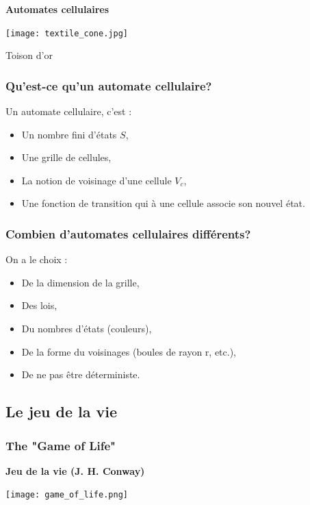 \documentclass{beamer}
\begin{document}
\begin{frame}
\begin{center}
\textbf{Automates cellulaires}
\end{center}

\begin{center}
\texttt{[image: textile\_cone.jpg]}
\end{center}

\begin{center}Toison d'or\end{center}

\end{frame}


\begin{frame}
\frametitle{Qu'est-ce qu'un automate cellulaire?}
\begin{block}{Un automate cellulaire, c'est :}
	\begin{itemize}
		\item Un nombre fini d'états $S$,
		\item Une grille de cellules,
		\item La notion de voisinage d'une cellule $V_c$,
		\item Une fonction de transition qui à une cellule associe son nouvel état.
	\end{itemize}
\end{block}
\end{frame}

\begin{frame}
\frametitle{Combien d'automates cellulaires différents?}
\begin{block}{On a le choix :}
	\begin{itemize}
	\item De la dimension de la grille,
	\item Des lois,
	\item Du nombres d'états (couleurs),
	\item De la forme du voisinages (boules de rayon r, etc.),
	\item De ne pas être déterministe.
	\end{itemize}
\end{block}
\end{frame}

\subsection{Le jeu de la vie}
\begin{frame}
\frametitle{The "Game of Life"}
\begin{center}
\bf{Jeu de la vie} (J. H. Conway)
\end{center}
\begin{center}
\texttt{[image: game\_of\_life.png]}
\end{center}
\end{frame}
\end{document}
